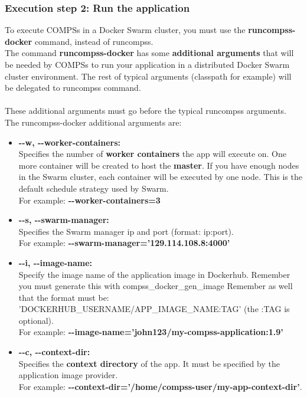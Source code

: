 \subsubsection{Execution step 2: Run the application}
To execute COMPSs in a Docker Swarm cluster, you must use the \textbf{runcompss-docker} command, instead of runcompss.
\\
The command \textbf{runcompss-docker} has some \textbf{additional arguments} that will be needed by COMPSs to run your application 
in a distributed Docker Swarm cluster environment.
The rest of typical arguments (classpath for example) will be delegated to runcompss command.
\\ \\
These additional arguments must go before the typical runcompss arguments. 
The runcompss-docker additional arguments are:
\begin{itemize}
 \item { 
 \textbf{-{}-w, -{}-worker-containers:} \\  
 Specifies the number of \textbf{worker containers} the app will execute on. One more container will be created to host the \textbf{master}. 
 If you have enough nodes in the Swarm cluster, each container will be executed by one node. This is the default schedule strategy used by Swarm. \\
 For example:  \textbf{-{}-worker-containers=3}
 }
 
 \item { 
 \textbf{-{}-s, -{}-swarm-manager:} \\
 Specifies the Swarm manager ip and port (format: ip:port). \\
 For example: \textbf{-{}-swarm-manager='129.114.108.8:4000'}
 }
 
 \item { 
 \textbf{-{}-i, -{}-image-name:} \\
 Specify the image name of the application image in Dockerhub. Remember you must generate this with compss\_docker\_gen\_image
 Remember as well that the format must be: 'DOCKERHUB\_USERNAME/APP\_IMAGE\_NAME:TAG' (the :TAG is optional). \\
 For example: \textbf{-{}-image-name='john123/my-compss-application:1.9'}
 }
                                 
 \item { 
 \textbf{-{}-c, -{}-context-dir:} \\
 Specifies the \textbf{context directory} of the app. It must be specified by the application image provider. \\
 For example: \textbf{-{}-context-dir='/home/compss-user/my-app-context-dir'}.
 }
\end{itemize}

